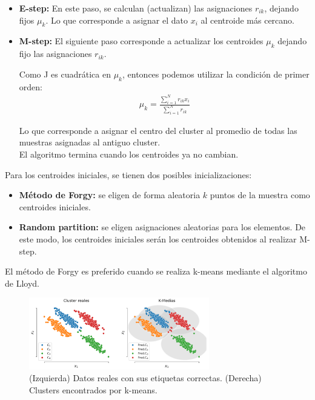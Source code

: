 \begin{itemize}
    \item \textbf{E-step:} En este paso, se calculan (actualizan) las asignaciones $r_{ik}$, dejando fijos $\mu_k$. Lo que corresponde a asignar el dato $x_i$ al centroide más cercano.
    \item \textbf{M-step:} El siguiente paso corresponde a actualizar los centroides $\mu_k$ dejando fijo las asignaciones $r_{ik}$.
    
    Como J es cuadrática en $\mu_k$, entonces podemos utilizar la condición de primer orden:
    \begin{align}
        \mu_k = \frac{\sum_{i=1}^N r_{ik}x_i}{\sum_{i=1}^N r_{ik}}
    \end{align}
    
    Lo que corresponde a asignar el centro del cluster al promedio de todas las muestras asignadas al antiguo cluster.\\
    
    El algoritmo termina cuando los centroides ya no cambian.
\end{itemize}


Para los centroides iniciales, se tienen dos posibles inicializaciones:

\begin{itemize}
	\item \textbf{Método de Forgy:} se eligen de forma aleatoria $k$ puntos de la muestra como centroides iniciales.
	\item \textbf{Random partition:} se eligen asignaciones aleatorias para los elementos. De este modo, los centroides iniciales serán los centroides obtenidos al realizar M-step.
\end{itemize}

El método de Forgy es preferido cuando se realiza k-means mediante el algoritmo de Lloyd.\\


\begin{figure}[h]
  \centering
  \includegraphics[width=0.7\textwidth]{img/cap6_k_medias}
  \caption{(Izquierda) Datos reales con sus etiquetas correctas. (Derecha) Clusters encontrados por k-means.}
  \label{fig:kmeans}
\end{figure}

